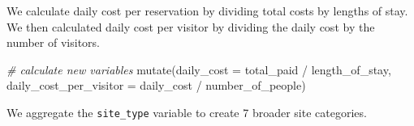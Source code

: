 \documentclass[
  11 pt,
  openany]{book}
\newenvironment{Shaded}{\begin{snugshade}}{\end{snugshade}}
\newcommand{\AttributeTok}[1]{\textcolor[rgb]{0.77,0.63,0.00}{#1}}
\newcommand{\CommentTok}[1]{\textcolor[rgb]{0.56,0.35,0.01}{\textit{#1}}}
\newcommand{\FunctionTok}[1]{\textcolor[rgb]{0.00,0.00,0.00}{#1}}
\newcommand{\NormalTok}[1]{#1}
\newcommand{\SpecialCharTok}[1]{\textcolor[rgb]{0.00,0.00,0.00}{#1}}
\begin{document}
We calculate daily cost per reservation by dividing total costs by lengths of stay. We then calculated daily cost per visitor by dividing the daily cost by the number of visitors.

\begin{Shaded}
\begin{Highlighting}[]
\CommentTok{\# calculate new variables}
\FunctionTok{mutate}\NormalTok{(}\AttributeTok{daily\_cost =}\NormalTok{ total\_paid }\SpecialCharTok{/}\NormalTok{ length\_of\_stay,}
       \AttributeTok{daily\_cost\_per\_visitor =}\NormalTok{ daily\_cost }\SpecialCharTok{/}\NormalTok{ number\_of\_people)}
\end{Highlighting}
\end{Shaded}

We aggregate the \texttt{site\_type} variable to create 7 broader site categories.
\end{document}
